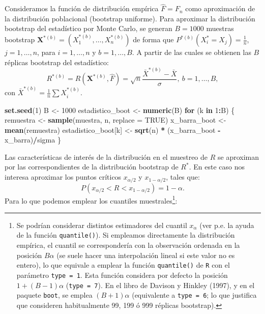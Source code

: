 \documentclass[]{book}
\newenvironment{Shaded}{\begin{snugshade}}{\end{snugshade}}
\newcommand{\KeywordTok}[1]{\textcolor[rgb]{0.13,0.29,0.53}{\textbf{#1}}}
\newcommand{\DataTypeTok}[1]{\textcolor[rgb]{0.13,0.29,0.53}{#1}}
\newcommand{\DecValTok}[1]{\textcolor[rgb]{0.00,0.00,0.81}{#1}}
\newcommand{\StringTok}[1]{\textcolor[rgb]{0.31,0.60,0.02}{#1}}
\newcommand{\OtherTok}[1]{\textcolor[rgb]{0.56,0.35,0.01}{#1}}
\newcommand{\ControlFlowTok}[1]{\textcolor[rgb]{0.13,0.29,0.53}{\textbf{#1}}}
\newcommand{\OperatorTok}[1]{\textcolor[rgb]{0.81,0.36,0.00}{\textbf{#1}}}
\newcommand{\NormalTok}[1]{#1}
\theoremstyle{break}
\theoremstyle{definition}
\theoremstyle{definition}
\theoremstyle{definition}
\theoremstyle{remark}
\begin{document}
Consideramos la función de distribución empírica \(\hat{F}=F_n\) como
aproximación de la distribución poblacional (bootstrap uniforme). Para
aproximar la distribución bootstrap del estadístico por Monte Carlo, se
generan \(B=1000\) muestras bootstrap
\(\mathbf{X}^{\ast (b)}=\left( X_1^{\ast (b)},\ldots ,X_n^{\ast (b)} \right)\)
de forma que
\(P^{\ast (b)}\left( X_i^{\ast}=X_j \right) = \frac{1}{n}\),
\(j=1,\ldots ,n\), para \(i=1,\ldots, n\) y \(b=1,\ldots, B\). A partir
de las cuales se obtienen las \(B\) réplicas bootstrap del estadístico:
\[R^{\ast (b)}=R\left( \mathbf{X}^{\ast (b)},\hat{F} \right) =\sqrt{n}\frac{
\bar{X}^{\ast  (b)}-\bar{X}}{\sigma }, \ b=1,\ldots, B, \] con
\(\bar{X}^{\ast (b)} = \frac{1}{n}\sum X_i^{\ast (b)}\).

\begin{Shaded}
\begin{Highlighting}[]
\KeywordTok{set.seed}\NormalTok{(}\DecValTok{1}\NormalTok{)}
\NormalTok{B <-}\StringTok{ }\DecValTok{1000}
\NormalTok{estadistico_boot <-}\StringTok{ }\KeywordTok{numeric}\NormalTok{(B)}
\ControlFlowTok{for}\NormalTok{ (k }\ControlFlowTok{in} \DecValTok{1}\OperatorTok{:}\NormalTok{B) \{}
\NormalTok{    remuestra <-}\StringTok{ }\KeywordTok{sample}\NormalTok{(muestra, n, }\DataTypeTok{replace =} \OtherTok{TRUE}\NormalTok{)}
\NormalTok{    x_barra_boot <-}\StringTok{ }\KeywordTok{mean}\NormalTok{(remuestra)}
\NormalTok{    estadistico_boot[k] <-}\StringTok{ }\KeywordTok{sqrt}\NormalTok{(n) }\OperatorTok{*}\StringTok{ }\NormalTok{(x_barra_boot }\OperatorTok{-}\StringTok{ }\NormalTok{x_barra)}\OperatorTok{/}\NormalTok{sigma}
\NormalTok{\}}
\end{Highlighting}
\end{Shaded}

Las características de interés de la distribución en el muestreo de
\(R\) se aproximan por las correspondientes de la distribución bootstrap
de \(R^{\ast}\). En este caso nos interesa aproximar los puntos críticos
\(x_{\alpha /2}\) y \(x_{1-\alpha /2}\), tales que:
\[P\left( x_{\alpha /2} < R < x_{1-\alpha /2} \right) = 1-\alpha.\] Para
lo que podemos emplear los cuantiles muestrales\footnote{Se podrían
  considerar distintos estimadores del cuantil \(x_{\alpha}\) (ver p.e.
  la ayuda de la función \texttt{quantile()}). Si empleamos directamente
  la distribución empírica, el cuantil se correspondería con la
  observación ordenada en la posición \(B \alpha\) (se suele hacer una
  interpolación lineal si este valor no es entero), lo que equivale a
  emplear la función \texttt{quantile()} de \texttt{R} con el parámetro
  \texttt{type\ =\ 1}. Esta función considera por defecto la posición
  \(1 + (B - 1) \alpha\) (\texttt{type\ =\ 7}). En el libro de Davison y
  Hinkley (1997), y en el paquete \texttt{boot}, se emplea
  \((B + 1) \alpha\) (equivalente a \texttt{type\ =\ 6}; lo que
  justifica que consideren habitualmente 99, 199 ó 999 réplicas
  bootstrap).}:
\end{document}
